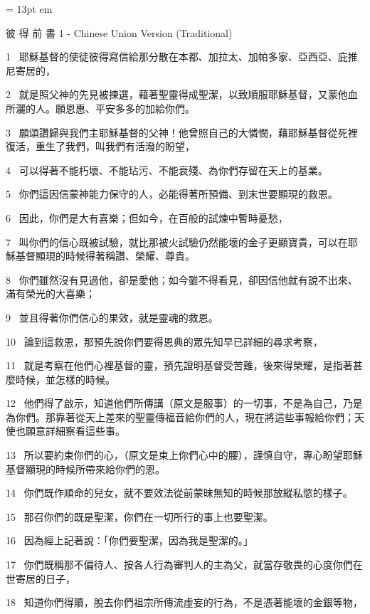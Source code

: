 
\FFrh \baselineskip = 13pt
 em


\centerline{  \FFbg
彼 得 前 書 1 - Chinese Union Version (Traditional) }

\par
1 
耶穌基督的使徒彼得寫信給那分散在本都、加拉太、加帕多家、亞西亞、庇推尼寄居的，
\par
2 
就是照父神的先見被揀選，藉著聖靈得成聖潔，以致順服耶穌基督，又蒙他血所灑的人。願恩惠、平安多多的加給你們。
\par
3 
願頌讚歸與我們主耶穌基督的父神！他曾照自己的大憐憫，藉耶穌基督從死裡復活，重生了我們，叫我們有活潑的盼望，
\par
4 
可以得著不能朽壞、不能玷污、不能衰殘、為你們存留在天上的基業。
\par
5 
你們這因信蒙神能力保守的人，必能得著所預備、到末世要顯現的救恩。
\par
6 
因此，你們是大有喜樂；但如今，在百般的試煉中暫時憂愁，
\par
7 
叫你們的信心既被試驗，就比那被火試驗仍然能壞的金子更顯寶貴，可以在耶穌基督顯現的時候得著稱讚、榮耀、尊貴。
\par
8 
你們雖然沒有見過他，卻是愛他；如今雖不得看見，卻因信他就有說不出來、滿有榮光的大喜樂；
\par
9 
並且得著你們信心的果效，就是靈魂的救恩。
\par
10 
論到這救恩，那預先說你們要得恩典的眾先知早已詳細的尋求考察，
\par
11 
就是考察在他們心裡基督的靈，預先證明基督受苦難，後來得榮耀，是指著甚麼時候，並怎樣的時候。
\par
12 
他們得了啟示，知道他們所傳講（原文是服事）的一切事，不是為自己，乃是為你們。那靠著從天上差來的聖靈傳福音給你們的人，現在將這些事報給你們；天使也願意詳細察看這些事。
\par
13 
所以要約束你們的心，（原文是束上你們心中的腰），謹慎自守，專心盼望耶穌基督顯現的時候所帶來給你們的恩。
\par
14 
你們既作順命的兒女，就不要效法從前蒙昧無知的時候那放縱私慾的樣子。
\par
15 
那召你們的既是聖潔，你們在一切所行的事上也要聖潔。
\par
16 
因為經上記著說：「你們要聖潔，因為我是聖潔的。」
\par
17 
你們既稱那不偏待人、按各人行為審判人的主為父，就當存敬畏的心度你們在世寄居的日子，
\par
18 
知道你們得贖，脫去你們祖宗所傳流虛妄的行為，不是憑著能壞的金銀等物，
\par
